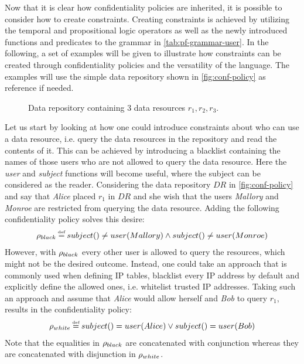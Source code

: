 Now that it is clear how confidentiality policies are inherited, it is possible to consider how to create constraints. Creating constraints is achieved by utilizing the temporal and propositional logic operators as well as the newly introduced functions and predicates to the grammar in \autoref{tab:pf-grammar-user}. In the following, a set of examples will be given to illustrate how constraints can be created through confidentiality policies and the versatility of the language. The examples will use the simple data repository shown in \autoref{fig:conf-policy} as reference if needed.

\begin{figure}[!ht]
    \begin{center}
        
        \caption{Data repository containing 3 data resources $r_1, r_2, r_3$.}
        \label{fig:conf-policy}
    \end{center}
\end{figure}

\begin{example}\label{ex:conf-reader-constraints}
Let us start by looking at how one could introduce constraints about who can use a data resource, i.e. query the data resources in the repository and read the contents of it. This can be achieved by introducing a blacklist containing the names of those users who are not allowed to query the data resource. Here the \emph{user} and \emph{subject} functions will become useful, where the subject can be considered as the reader. Considering the data repository $DR$ in \autoref{fig:conf-policy} and say that \emph{Alice} placed $r_1$ in $DR$ and she wish that the users \emph{Mallory} and \emph{Monroe} are restricted from querying the data resource. Adding the following confidentiality policy solves this desire:
\begin{align*}
    \conf_{black} \eqdef subject() \neq user(Mallory) \land subject() \neq user(Monroe)
\end{align*}
However, with $\rho_{black}$ every other user is allowed to query the resources, which might not be the desired outcome. Instead, one could take an approach that is commonly used when defining IP tables, blacklist every IP address by default and explicitly define the allowed ones, i.e. whitelist trusted IP addresses. Taking such an approach and assume that \emph{Alice} would allow herself and \emph{Bob} to query $r_1$, results in the confidentiality policy:
\begin{align*}
    \conf_{white} \eqdef subject() = user(Alice) \lor subject() = user(Bob)
\end{align*}
Note that the equalities in $\rho_{black}$ are concatenated with conjunction whereas they are concatenated with disjunction in $\rho_{white}$.
\end{example}

